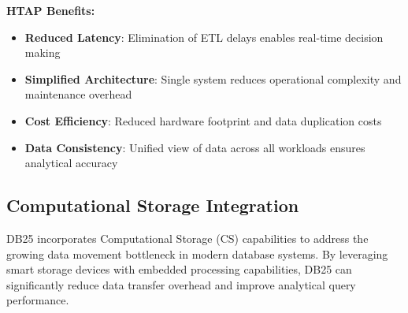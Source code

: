\documentclass[12pt,a4paper]{article}
\begin{document}
    \textbf{HTAP Benefits:}
    \begin{itemize}
        \item \textbf{Reduced Latency}: Elimination of ETL delays enables real-time decision making
        \item \textbf{Simplified Architecture}: Single system reduces operational complexity and maintenance overhead
        \item \textbf{Cost Efficiency}: Reduced hardware footprint and data duplication costs
        \item \textbf{Data Consistency}: Unified view of data across all workloads ensures analytical accuracy
    \end{itemize}

    \subsection{Computational Storage Integration}

    DB25 incorporates Computational Storage (CS) capabilities to address the growing data movement bottleneck in modern database systems. By leveraging smart storage devices with embedded processing capabilities, DB25 can significantly reduce data transfer overhead and improve analytical query performance.
\end{document}
